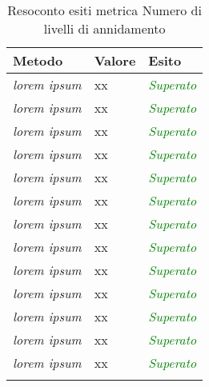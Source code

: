 \begin{longtable}{|>{\centering\arraybackslash}p{5cm}|>{\centering\arraybackslash}p{3cm}|>{\centering\arraybackslash}p{3cm}|}
	\hline
	\rowcolor{Gray}
	\textbf{Metodo} & \textbf{Valore} & \textbf{Esito} \\
	\hline
	
	\textit{lorem ipsum} & xx & \textcolor{Green}{\textit{Superato}}\\
	\hline
	\textit{lorem ipsum} & xx & \textcolor{Green}{\textit{Superato}}\\
	\hline
	\textit{lorem ipsum} & xx & \textcolor{Green}{\textit{Superato}}\\
	\hline
	\textit{lorem ipsum} & xx & \textcolor{Green}{\textit{Superato}}\\
	\hline
	\textit{lorem ipsum} & xx & \textcolor{Green}{\textit{Superato}}\\
	\hline
	\textit{lorem ipsum} & xx & \textcolor{Green}{\textit{Superato}}\\
	\hline
	\textit{lorem ipsum} & xx & \textcolor{Green}{\textit{Superato}}\\
	\hline
	\textit{lorem ipsum} & xx & \textcolor{Green}{\textit{Superato}}\\
	\hline
	\textit{lorem ipsum} & xx & \textcolor{Green}{\textit{Superato}}\\
	\hline
	\textit{lorem ipsum} & xx & \textcolor{Green}{\textit{Superato}}\\
	\hline
	\textit{lorem ipsum} & xx & \textcolor{Green}{\textit{Superato}}\\
	\hline
	\textit{lorem ipsum} & xx & \textcolor{Green}{\textit{Superato}}\\
	\hline
	\textit{lorem ipsum} & xx & \textcolor{Green}{\textit{Superato}}\\
	\hline
	
	\caption{Resoconto esiti metrica Numero di livelli di annidamento}
\end{longtable}